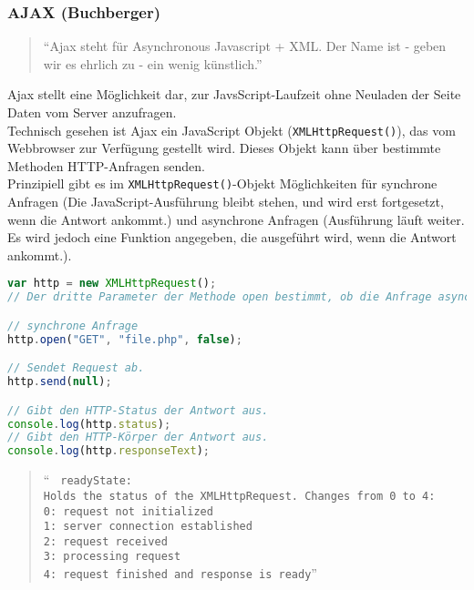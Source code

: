 \subsubsection{AJAX (Buchberger)} 
\label{sec:content_js_AJAX}
\begin{quote}
\enquote{Ajax steht für Asynchronous Javascript + XML. Der Name ist - geben wir es ehrlich zu - ein wenig künstlich.} \cite[S. 317]{ajax}
\end{quote}
Ajax stellt eine Möglichkeit dar, zur JavsScript-Laufzeit ohne Neuladen der Seite Daten vom Server anzufragen.\\
Technisch gesehen ist Ajax ein JavaScript Objekt (\texttt{XMLHttpRequest()}), das vom Webbrowser zur Verfügung gestellt wird. Dieses Objekt kann über bestimmte Methoden HTTP-Anfragen senden.\\
Prinzipiell gibt es im \texttt{XMLHttpRequest()}-Objekt Möglichkeiten für synchrone Anfragen (Die JavaScript-Ausführung bleibt stehen, und wird erst fortgesetzt, wenn die Antwort ankommt.) und asynchrone Anfragen (Ausführung läuft weiter. Es wird jedoch eine Funktion angegeben, die ausgeführt wird, wenn die Antwort ankommt.).\\
\begin{lstlisting}[style=custom, language=JavaScript,  caption={Synchrones AJAX},label={lst:content_ajax_0}]
var http = new XMLHttpRequest();
// Der dritte Parameter der Methode open bestimmt, ob die Anfrage asynchron sein soll.

// synchrone Anfrage
http.open("GET", "file.php", false);

// Sendet Request ab.
http.send(null);

// Gibt den HTTP-Status der Antwort aus.
console.log(http.status);
// Gibt den HTTP-Körper der Antwort aus.
console.log(http.responseText);
\end{lstlisting}
\begin{quote}
\enquote{
\texttt{
readyState:\\
Holds the status of the XMLHttpRequest. Changes from 0 to 4:\\
0: request not initialized\\
1: server connection established\\
2: request received\\
3: processing request\\ 
4: request finished and response is ready}}\\
\cite[\url{http://www.w3schools.com/ajax/ajax_xmlhttprequest_onreadystatechange.asp}]{w3schools}
\end{quote}
